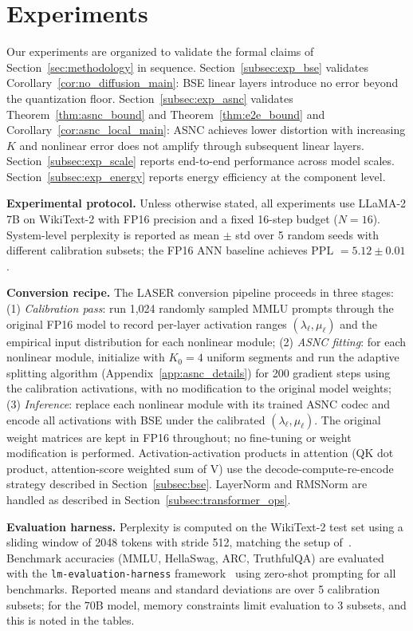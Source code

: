 \documentclass{article}
\theoremstyle{plain}
\theoremstyle{definition}
\theoremstyle{remark}
\begin{document}
\section{Experiments}
\label{sec:experiments}

Our experiments are organized to validate the formal claims of
Section~\ref{sec:methodology} in sequence. Section~\ref{subsec:exp_bse} validates
Corollary~\ref{cor:no_diffusion_main}: BSE linear layers introduce no error beyond
the quantization floor. Section~\ref{subsec:exp_asnc} validates
Theorem~\ref{thm:asnc_bound} and Theorem~\ref{thm:e2e_bound} and Corollary~\ref{cor:asnc_local_main}: ASNC achieves
lower distortion with increasing $K$ and nonlinear error does not amplify through
subsequent linear layers. Section~\ref{subsec:exp_scale} reports end-to-end
performance across model scales. Section~\ref{subsec:exp_energy} reports energy
efficiency at the component level.

\noindent\textbf{Experimental protocol.}
Unless otherwise stated, all experiments use LLaMA-2 7B on WikiText-2 with FP16
precision and a fixed 16-step budget ($N = 16$). System-level perplexity is reported
as mean $\pm$ std over 5 random seeds with different calibration subsets; the FP16
ANN baseline achieves PPL $= 5.12 \pm 0.01$.

\noindent\textbf{Conversion recipe.}
The LASER conversion pipeline proceeds in three stages: (1) \emph{Calibration pass}:
run 1,024 randomly sampled MMLU prompts through the original FP16 model to record
per-layer activation ranges $(\lambda_\ell, \mu_\ell)$ and the empirical input
distribution for each nonlinear module; (2) \emph{ASNC fitting}: for each nonlinear
module, initialize with $K_0 = 4$ uniform segments and run the adaptive splitting
algorithm (Appendix~\ref{app:asnc_details}) for 200 gradient steps using the
calibration activations, with no modification to the original model weights;
(3) \emph{Inference}: replace each nonlinear module with its trained ASNC codec and
encode all activations with BSE under the calibrated $(\lambda_\ell, \mu_\ell)$.
The original weight matrices are kept in FP16 throughout; no fine-tuning or
weight modification is performed. Activation-activation products in attention
(QK dot product, attention-score weighted sum of V) use the
decode-compute-re-encode strategy described in Section~\ref{subsec:bse}. LayerNorm
and RMSNorm are handled as described in Section~\ref{subsec:transformer_ops}.

\noindent\textbf{Evaluation harness.}
Perplexity is computed on the WikiText-2 test set using a sliding window of 2048
tokens with stride 512, matching the setup of~\citet{press2022train}. Benchmark
accuracies (MMLU, HellaSwag, ARC, TruthfulQA) are evaluated with the
\texttt{lm-evaluation-harness} framework~\citep{eval-harness} using zero-shot
prompting for all benchmarks. Reported means and standard deviations are over 5
calibration subsets; for the 70B model, memory constraints limit evaluation to 3
subsets, and this is noted in the tables.
\end{document}
